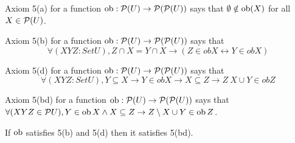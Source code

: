 %
\begin{definition}\label{CJ5a}
	\leanok
	Axiom 5(a) for a function $\operatorname{ob}: \mathcal P(U) \to \mathcal P(\mathcal P(U))$ says that $\emptyset\notin\operatorname{ob}(X)$ for all $X\in\mathcal P(U)$.
\end{definition}



\begin{definition}\label{CJ5b}
	\leanok
	Axiom 5(b) for a function $\operatorname{ob}: \mathcal P(U) \to \mathcal P(\mathcal P(U))$ says that
	\[
	∀ (X Y Z : Set U), Z ∩ X = Y ∩ X → (Z ∈ ob X ↔ Y ∈ ob X)
	\]

\end{definition}
 
\begin{definition}\label{CJ5d}
	\leanok
	Axiom 5(d) for a function $\operatorname{ob}: \mathcal P(U) \to \mathcal P(\mathcal P(U))$ says that
	\[
	  ∀ (X Y Z : Set U), Y ⊆ X → Y ∈ ob X → X ⊆ Z → Z \ X ∪ Y ∈ ob Z
	\]

\end{definition}
 
 
\begin{definition}\label{CJ5bd}
	\leanok
	Axiom 5(bd) for a function $\operatorname{ob}: \mathcal P(U) \to \mathcal P(\mathcal P(U))$ says that
	$\forall (X Y Z \in\mathcal P U), Y \in \operatorname{ob} X \land X \subseteq Z \to Z \setminus X \cup Y \in \operatorname{ob} Z$.
\end{definition}


\begin{theorem}\label{bd5}
	\leanok
	If $\operatorname{ob}$ satisfies 5(b) and 5(d) then it satisfies 5(bd).
\end{theorem}
